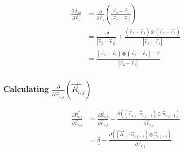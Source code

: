 \documentclass{article}
\renewcommand{\ij}{_{i,j}}
\newcommand{\ijj}{_{i,j-1}}
\newcommand{\magn}[1]{\left\vert #1 \right\vert }
\renewcommand{\part}[2]{\frac{\partial #1 }{\partial #2}}
\newcommand{\partbig}[2]{\frac{\partial }{\partial #2}\left( #1 \right)}
\newcommand{\ten}[1]{\underline{\underline{#1}}}
\newcommand{\rij}{\vec{r} \ij}
\newcommand{\Rij}{\vec{R} \ij}
\begin{document}
\begin{align*}
  \part{\vec{u}_{12}}{\vec{r}_{1}} 
  &=
  \partbig{\frac{\vec{r}_2 - \vec{r}_1}{\magn{\vec{r}_2 - \vec{r}_1}}}
  {\vec{r}_{1}}
  \\
  &=
  \frac{-\ten{\delta}}
  {\magn{\vec{r}_{2} - \vec{r}_{1}}} 
  + 
  \frac{(\vec{r}_{2} - \vec{r}_{1} ) 
  \otimes 
  (\vec{r}_{2} - \vec{r}_{1} )
  }
  {\magn{\vec{r}_{2} - \vec{r}_{1}}} \\
  & = 
  \frac{
  (\vec{r}_{2} - \vec{r}_{1} ) 
  \otimes 
  (\vec{r}_{2} - \vec{r}_{1} )
  -
  \ten{\delta}  
  }
  {\magn{\vec{r}_{2} - \vec{r}_{1}}} 
\end{align*}

 \subsubsection{Calculating $\displaystyle\partbig{\Rij^\perp}{\rij}$}

\begin{align*}
  \label{eqn:Rperpri}
  \part{\vec{R}\ij ^ \bot}{\vec{r}\ij}  
  &=
  \part{\Rij}{\rij}
  - \part{\left(\left(\vec{r}\ij \cdot \vec{u} \ijj \right) \otimes 
  \vec{u} \ijj \right)
  }{\vec{r}\ij}
  \\
  &=
  \ten{\delta} 
  - \part{\left(\left(\vec{R}\ij \cdot \vec{u} \ijj \right) \otimes 
  \vec{u} \ijj \right)
  }{\vec{r}\ij}
\end{align*}
\end{document}
